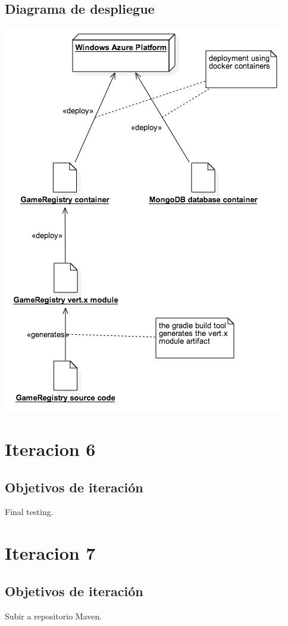 \documentclass[12pt,a4paper]{report}
\begin{document}
\section{Diagrama de despliegue}
\begin{center}
 \includegraphics[scale=0.6]{diagrams/docker_deployment_diagram.png}
\end{center}
 
\chapter{Iteracion 6}
\section{Objetivos de iteración}
Final testing.

\chapter{Iteracion 7}
\section{Objetivos de iteración}
Subir a repositorio Maven.
\end{document}
